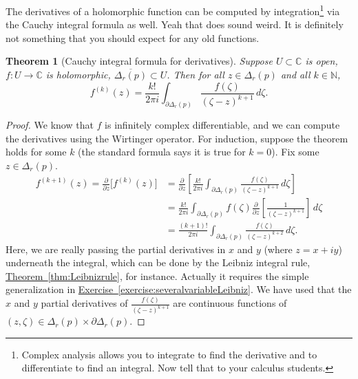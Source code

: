 \documentclass[12pt,openany]{book}
\newcommand{\C}{{\mathbb{C}}}
\newcommand{\N}{{\mathbb{N}}}
\theoremstyle{plain}
\newtheorem{thm}{Theorem}[section]
\theoremstyle{remark}
\theoremstyle{definition}
\theoremstyle{exercise}
\theoremstyle{example}
\newcommand{\exerciseref}[1]{\hyperref[#1]{Exercise~\ref*{#1}}}
\newcommand{\thmref}[1]{\hyperref[#1]{Theorem~\ref*{#1}}}
\begin{document}
The derivatives of a holomorphic function can be computed by
integration\footnote{Complex analysis allows you to integrate to find the
derivative and to differentiate to find an integral.  Now tell that to your
calculus students.} via the Cauchy integral formula as well.  Yeah that does sound
weird.  It is definitely not something that you should expect for any old
functions.

\begin{thm}[Cauchy integral formula for derivatives]
Suppose $U \subset \C$ is open, $f \colon U \to \C$ is holomorphic,
$\overline{\Delta_r(p)} \subset U$.
Then for all $z \in \Delta_r(p)$ and all $k \in \N$,
\begin{equation*}
f^{(k)}(z)
=
\frac{k!}{2\pi i}
\int_{\partial \Delta_r(p)}
\frac{f(\zeta)}{(\zeta-z)^{k+1}}
\,
d \zeta .
\end{equation*}
\end{thm}

\begin{proof}
We know that $f$ is infinitely complex differentiable, and we can compute
the derivatives using the Wirtinger operator.
For induction, suppose the theorem holds for some $k$
(the standard formula says it is true for $k=0$).  Fix some $z \in
\Delta_r(p)$.
\begin{equation*}
\begin{split}
f^{(k+1)}(z)
=
\frac{\partial }{\partial z}
\bigl[ f^{(k)}(z) \bigr]
& =
\frac{\partial }{\partial z}
\left[
\frac{k!}{2\pi i}
\int_{\partial \Delta_r(p)}
\frac{f(\zeta)}{(\zeta-z)^{k+1}}
\,
d \zeta
\right]
\\
& = 
\frac{k!}{2\pi i}
\int_{\partial \Delta_r(p)}
f(\zeta)
\frac{\partial }{\partial z}
\left[
\frac{1}{(\zeta-z)^{k+1}}
\right]
\,
d \zeta
\\
& = 
\frac{(k+1)!}{2\pi i}
\int_{\partial \Delta_r(p)}
\frac{f(\zeta)}{(\zeta-z)^{k+2}}
\,
d \zeta .
\end{split}
\end{equation*}
Here, we are really passing the partial derivatives in $x$ and $y$ (where $z=x+iy$)
underneath the integral,
which can be done by 
the Leibniz integral rule, \thmref{thm:Leibnizrule}, for instance.
Actually it requires the simple generalization in
\exerciseref{exercise:severalvariableLeibniz}.
We have used that the
$x$ and $y$ partial derivatives of 
$\frac{f(\zeta)}{(\zeta-z)^{k+1}}$ are continuous
functions of $(z,\zeta) \in \Delta_r(p) \times \partial \Delta_r(p)$.
\end{proof}
\end{document}
